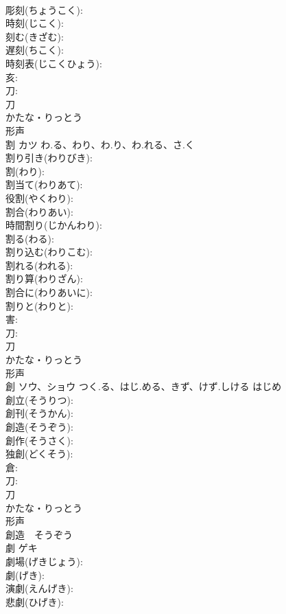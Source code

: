 \documentclass[8pt]{extreport}
\begin{document}
\begin{CJK}{UTF8}{min}
\\	彫刻(ちょうこく): 
\\	時刻(じこく): 
\\	刻む(きざむ): 
\\	遅刻(ちこく): 
\\	時刻表(じこくひょう): 
\\	亥: 
\\	刀: 
\\	刀	
\\	かたな・りっとう	
\\	形声 
\\	割	カツ	わ.る、わり、わ.り、わ.れる、さ.く		
\\	割り引き(わりびき): 
\\	割(わり): 
\\	割当て(わりあて): 
\\	役割(やくわり): 
\\	割合(わりあい): 
\\	時間割り(じかんわり): 
\\	割る(わる): 
\\	割り込む(わりこむ): 
\\	割れる(われる): 
\\	割り算(わりざん): 
\\	割合に(わりあいに): 
\\	割りと(わりと): 
\\	害: 
\\	刀: 
\\	刀	
\\	かたな・りっとう	
\\	形声 
\\	創	ソウ、ショウ	つく.る、はじ.める、きず、けず.しける	はじめ	
\\	創立(そうりつ): 
\\	創刊(そうかん): 
\\	創造(そうぞう): 
\\	創作(そうさく): 
\\	独創(どくそう): 
\\	倉: 
\\	刀: 
\\	刀	
\\	かたな・りっとう	
\\	形声 
\\	創造　そうぞう 
\\	劇	ゲキ			
\\	劇場(げきじょう): 
\\	劇(げき): 
\\	演劇(えんげき): 
\\	悲劇(ひげき): 

\end{CJK}
\end{document}
